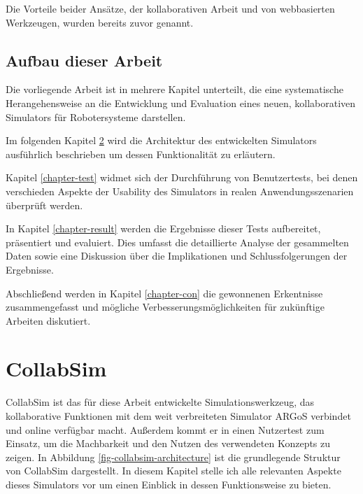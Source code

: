 \documentclass[german,version-2020-11]{uzl-thesis}
\begin{document}
    Die Vorteile beider Ansätze, der kollaborativen Arbeit und von webbasierten Werkzeugen, wurden bereits zuvor genannt.

\section{Aufbau dieser Arbeit}

 Die vorliegende Arbeit ist in mehrere Kapitel unterteilt, die eine systematische Herangehensweise an die Entwicklung und Evaluation eines neuen, kollaborativen Simulators für Robotersysteme darstellen. 
 
 Im folgenden Kapitel \ref{chapter-sim} wird die Architektur des entwickelten Simulators ausführlich beschrieben um dessen Funktionalität zu erläutern. 

 Kapitel \ref{chapter-test} widmet sich der Durchführung von Benutzertests, bei denen verschieden Aspekte der Usability des Simulators in realen Anwendungsszenarien überprüft werden. 
 
 In Kapitel \ref{chapter-result} werden die Ergebnisse dieser Tests aufbereitet, präsentiert und evaluiert. 
 Dies umfasst die detaillierte Analyse der gesammelten Daten sowie eine Diskussion über die Implikationen und Schlussfolgerungen der Ergebnisse. 
 
 Abschließend werden in Kapitel \ref{chapter-con} die gewonnenen Erkentnisse zusammengefasst und mögliche Verbesserungsmöglichkeiten für zukünftige Arbeiten diskutiert. 




%

\chapter{CollabSim}%
\label{chapter-sim}

CollabSim ist das für diese Arbeit entwickelte Simulationswerkzeug, das kollaborative Funktionen mit dem weit verbreiteten Simulator ARGoS verbindet und online verfügbar macht. 
Außerdem kommt er in einen Nutzertest zum Einsatz, um die Machbarkeit und den Nutzen des verwendeten Konzepts zu zeigen.  
In Abbildung \vref{fig-collabsim-architecture} ist die grundlegende Struktur von CollabSim dargestellt. 
In diesem Kapitel stelle ich alle relevanten Aspekte dieses Simulators vor um einen Einblick in dessen Funktionsweise zu bieten.
\end{document}
